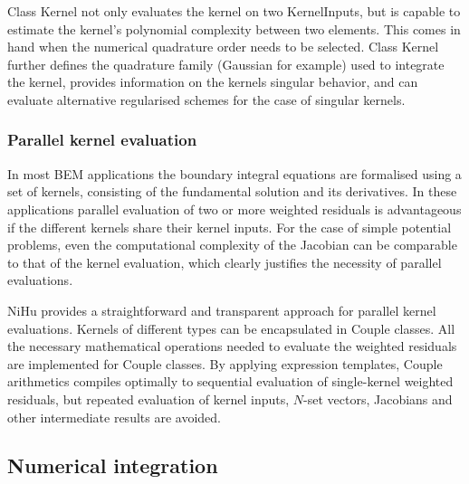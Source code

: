 \documentclass[review]{elsarticle}
\begin{document}
Class Kernel not only evaluates the kernel on two KernelInputs, but is capable to estimate the kernel's polynomial complexity between two elements.
This comes in hand when the numerical quadrature order needs to be selected.
Class Kernel further defines the quadrature family (Gaussian for example) used to integrate the kernel, provides information on the kernels singular behavior, and can evaluate alternative regularised schemes for the case of singular kernels.


\subsubsection{Parallel kernel evaluation}

In most BEM applications the boundary integral equations are formalised using a set of kernels, consisting of the fundamental solution and its derivatives.
In these applications parallel evaluation of two or more weighted residuals is advantageous if the different kernels share their kernel inputs.
For the case of simple potential problems, even the computational complexity of the Jacobian can be comparable to that of the kernel evaluation, which clearly justifies the necessity of parallel evaluations.

NiHu provides a straightforward and transparent approach for parallel kernel evaluations.
Kernels of different types can be encapsulated in Couple classes.
All the necessary mathematical operations needed to evaluate the weighted residuals are implemented for Couple classes.
By applying expression templates, Couple arithmetics compiles optimally to sequential evaluation of single-kernel weighted residuals, but repeated evaluation of kernel inputs, $N$-set vectors, Jacobians and other intermediate results are avoided.

\subsection{Numerical integration}





\end{document}
